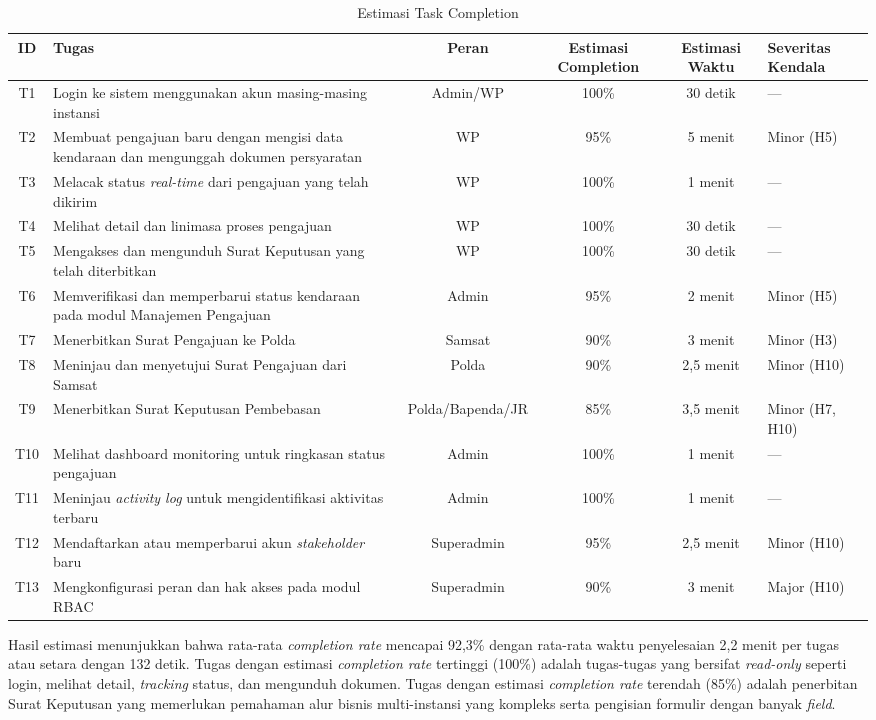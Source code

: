 \documentclass[conference]{IEEEtran}
\begin{document}
\begin{table}[!t]
\centering
\caption{Estimasi Task Completion}
\label{tab:task-completion}
\renewcommand{\arraystretch}{1.3}
\begin{tabular}{|c|l|c|c|c|l|}
\hline
\textbf{ID} & \textbf{Tugas} & \textbf{Peran} & \textbf{Estimasi Completion} & \textbf{Estimasi Waktu} & \textbf{Severitas Kendala} \\
\hline
T1 & Login ke sistem menggunakan akun masing-masing instansi & Admin/WP & 100\% & 30 detik & --- \\
T2 & Membuat pengajuan baru dengan mengisi data kendaraan dan mengunggah dokumen persyaratan & WP & 95\% & 5 menit & Minor (H5) \\
T3 & Melacak status \emph{real-time} dari pengajuan yang telah dikirim & WP & 100\% & 1 menit & --- \\
T4 & Melihat detail dan linimasa proses pengajuan & WP & 100\% & 30 detik & --- \\
T5 & Mengakses dan mengunduh Surat Keputusan yang telah diterbitkan & WP & 100\% & 30 detik & --- \\
T6 & Memverifikasi dan memperbarui status kendaraan pada modul Manajemen Pengajuan & Admin & 95\% & 2 menit & Minor (H5) \\
T7 & Menerbitkan Surat Pengajuan ke Polda & Samsat & 90\% & 3 menit & Minor (H3) \\
T8 & Meninjau dan menyetujui Surat Pengajuan dari Samsat & Polda & 90\% & 2,5 menit & Minor (H10) \\
T9 & Menerbitkan Surat Keputusan Pembebasan & Polda/Bapenda/JR & 85\% & 3,5 menit & Minor (H7, H10) \\
T10 & Melihat dashboard monitoring untuk ringkasan status pengajuan & Admin & 100\% & 1 menit & --- \\
T11 & Meninjau \emph{activity log} untuk mengidentifikasi aktivitas terbaru & Admin & 100\% & 1 menit & --- \\
T12 & Mendaftarkan atau memperbarui akun \emph{stakeholder} baru & Superadmin & 95\% & 2,5 menit & Minor (H10) \\
T13 & Mengkonfigurasi peran dan hak akses pada modul RBAC & Superadmin & 90\% & 3 menit & Major (H10) \\
\hline
\end{tabular}
\end{table}

Hasil estimasi menunjukkan bahwa rata-rata \emph{completion rate} mencapai 92,3\% dengan
rata-rata waktu penyelesaian 2,2 menit per tugas atau setara dengan 132 detik. Tugas
dengan estimasi \emph{completion rate} tertinggi (100\%) adalah tugas-tugas yang bersifat
\emph{read-only} seperti login, melihat detail, \emph{tracking} status, dan mengunduh
dokumen. Tugas dengan estimasi \emph{completion rate} terendah (85\%) adalah penerbitan
Surat Keputusan yang memerlukan pemahaman alur bisnis multi-instansi yang kompleks
serta pengisian formulir dengan banyak \emph{field}.
\end{document}
